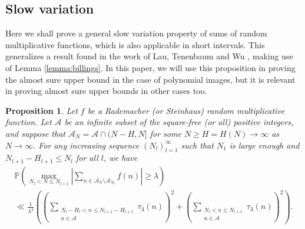 \documentclass[11pt]{tran-l}
\newtheorem{prop}[theorem]{Proposition}
\theoremstyle{definition}
\theoremstyle{remark}
\numberwithin{equation}{section}
\begin{document}
\subsection{Slow variation} Here we shall prove a general slow variation property of sums of random multiplicative functions, which is also applicable in short intervals. This generalizes a result found in the work of Lau, Tenenbaum and Wu \cite{LauTenenbaumWu2013MeanValuesRMF}, making use of Lemma \ref{lemma:billings}. In this paper, we will use this proposition in proving the almost sure upper bound in the case of polynomial images, but it is relevant in proving almost sure upper bounds in other cases too. \begin{prop}\label{prop:slowVar}
Let $f$ be a Rademacher (or Steinhaus) random multiplicative function. Let $\mathcal A$ be an infinite subset of the square-free (or all) positive integers, and suppose that $\mathcal A_N=\mathcal A\cap (N-H, N]$ for some $N\geq H=H(N)\to\infty$ as $N\to\infty$. For any increasing sequence $(N_l)_{l=1}^\infty$ such that $N_1$ is large enough and $N_{l+1}-H_{l+1}\leq N_l$ for all $l$, we have
\begin{multline*}
\mathbb P\left(\max_{N_l<N\leq N_{l+1}}\left\lvert\sum_{n\in\mathcal A_N\setminus\mathcal A_{N_l}}f(n)\right\rvert\geq\lambda\right) \\  \ll \frac{1}{\lambda^4}\left(\left(\sum_{\substack{N_l - H_l<n\leq N_{l+1} - H_{l+1} \\ n\in\mathcal A}} \tau_3(n)\right)^2 + \left(\sum_{\substack{N_l<n\leq N_{l+1} \\ n\in\mathcal A}} \tau_3(n)\right)^2 \right).
\end{multline*} 
\end{prop}
\end{document}

